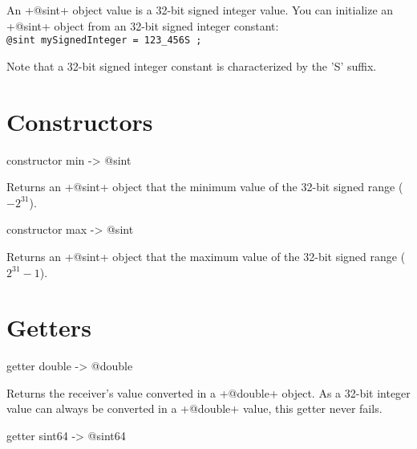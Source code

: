 

An \ggs+@sint+ object value is a 32-bit signed integer value. You can initialize an \ggs+@sint+ object from an 32-bit signed integer constant:\\

\texttt{@sint mySignedInteger = 123\_456S ;}

Note that a 32-bit signed integer constant is characterized by the 'S' suffix.


\section{Constructors}


\begin{galgas}
constructor min -> @sint
\end{galgas}

Returns an \ggs+@sint+ object that the minimum value of the 32-bit signed range ($-2^{31}$).






\begin{galgas}
constructor max -> @sint
\end{galgas}


Returns an \ggs+@sint+ object that the maximum value of the 32-bit signed range ($2^{31}-1$).



\section{Getters}


\begin{galgas}
getter double -> @double
\end{galgas}

Returns the receiver's value converted in a \ggs+@double+ object. As a 32-bit integer value can always be converted in a \ggs+@double+ value, this getter never fails.






\begin{galgas}
getter sint64 -> @sint64
\end{galgas}

